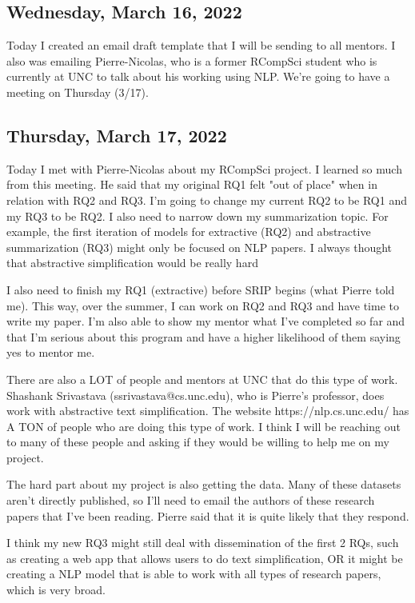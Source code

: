 \documentclass[11pt,letterpaper]{article}
\begin{document}
\subsection{Wednesday, March 16, 2022}
Today I created an email draft template that I will be sending to all mentors. I also was emailing Pierre-Nicolas, who is a former RCompSci student who is currently at UNC to talk about his working using NLP. We're going to have a meeting on Thursday (3/17).

\subsection{Thursday, March 17, 2022}
Today I met with Pierre-Nicolas about my RCompSci project. I learned so much from this meeting. He said that my original RQ1 felt "out of place" when in relation with RQ2 and RQ3. I'm going to change my current RQ2 to be RQ1 and my RQ3 to be RQ2. I also need to narrow down my summarization topic. For example, the first iteration of models for extractive (RQ2) and abstractive summarization (RQ3) might only be focused on NLP papers. I always thought that abstractive simplification would be really hard

I also need to finish my RQ1 (extractive) before SRIP begins (what Pierre told me). This way, over the summer, I can work on RQ2 and RQ3 and have time to write my paper. I'm also able to show my mentor what I've completed so far and that I'm serious about this program and have a higher likelihood of them saying yes to mentor me. 

There are also a LOT of people and mentors at UNC that do this type of work. Shashank Srivastava (ssrivastava@cs.unc.edu), who is Pierre's professor, does work with abstractive text simplification. The website https://nlp.cs.unc.edu/ has A TON of people who are doing this type of work. I think I will be reaching out to many of these people and asking if they would be willing to help me on my project.

The hard part about my project is also getting the data. Many of these datasets aren't directly published, so I'll need to email the authors of these research papers that I've been reading. Pierre said that it is quite likely that they respond. 

I think my new RQ3 might still deal with dissemination of the first 2 RQs, such as creating a web app that allows users to do text simplification, OR it might be creating a NLP model that is able to work with all types of research papers, which is very broad. 
\end{document}
